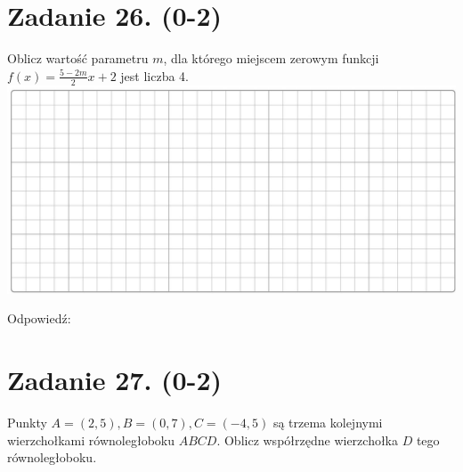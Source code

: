 \documentclass[10pt]{article}
\begin{document}
\section*{Zadanie 26. (0-2)}
Oblicz wartość parametru \(m\), dla którego miejscem zerowym funkcji \(f(x)=\frac{5-2 m}{2} x+2\) jest liczba 4.\\
\includegraphics[max width=\textwidth, center]{2024_11_21_6574e892c2387ce90f12g-10}

Odpowiedź: \(\qquad\)

\section*{Zadanie 27. (0-2)}
Punkty \(A=(2,5), B=(0,7), C=(-4,5)\) są trzema kolejnymi wierzchołkami równoległoboku \(A B C D\). Oblicz współrzędne wierzchołka \(D\) tego równoległoboku.
\end{document}
